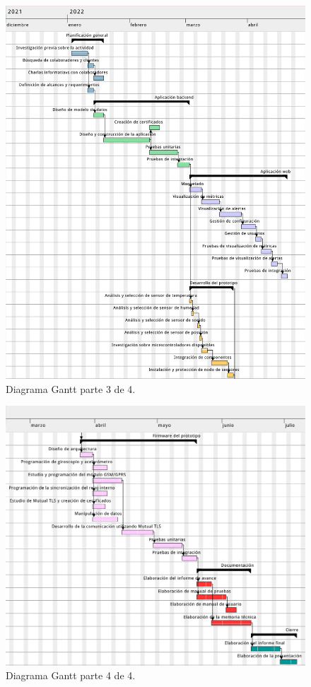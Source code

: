 \documentclass[
11pt, %
codirector, %
]{charter}
\begin{document}
\begin{figure}[htpb]
\centering 
\includegraphics[width=1.1\textwidth]{./Figuras/gantt-3-bis.png}
\caption{Diagrama Gantt parte 3 de 4.}
\label{fig:gantt3}
\end{figure}

\begin{figure}[htpb]
\centering 
\includegraphics[width=1.1\textwidth]{./Figuras/gantt-4-bis.png}
\caption{Diagrama Gantt parte 4 de 4.}
\label{fig:gantt4}
\end{figure}
\end{document}
